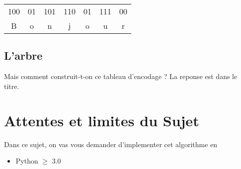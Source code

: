 \documentclass[12pt, letterpaper, twoside]{article}
\begin{document}
\begin{tabular}{ c c c c c c c }
    100 & 01 & 101 & 110 & 01 & 111 & 00 \\
     B & o & n & j & o & u &r 
\end{tabular}

\subsection{L'arbre}

Mais comment construit-t-on ce tableau d'encodage ? La reponse est dans le titre.

\section{Attentes et limites du Sujet}
 
Dans ce sujet, on vas vous demander d'implementer cet algorithme en
\begin{itemize}
    \item Python $\ge$ 3.0
\end{itemize}
\end{document}
